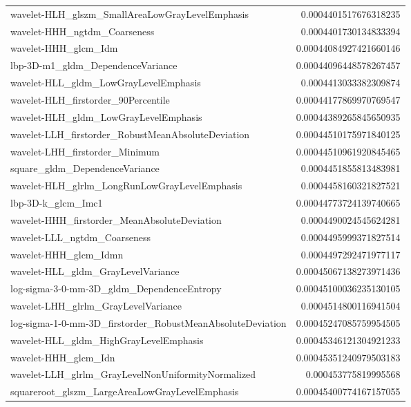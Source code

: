 {\begin{xltabular}[H]{\textwidth}{X r}
        wavelet-HLH\_glszm\_SmallAreaLowGrayLevelEmphasis & 0.0004401517676318235 \\
        wavelet-HHH\_ngtdm\_Coarseness & 0.0004401730134833394 \\
        wavelet-HHH\_glcm\_Idm & 0.00044084927421660146 \\
        lbp-3D-m1\_gldm\_DependenceVariance & 0.00044096448578267457 \\
        wavelet-HLL\_gldm\_LowGrayLevelEmphasis & 0.0004413033382309874 \\
        wavelet-HLH\_firstorder\_90Percentile & 0.00044177869970769547 \\
        wavelet-HLH\_gldm\_LowGrayLevelEmphasis & 0.00044389265845650935 \\
        wavelet-LLH\_firstorder\_RobustMeanAbsoluteDeviation & 0.00044510175971840125 \\
        wavelet-LHH\_firstorder\_Minimum & 0.00044510961920845465 \\
        square\_gldm\_DependenceVariance & 0.0004451855813483981 \\
        wavelet-HLH\_glrlm\_LongRunLowGrayLevelEmphasis & 0.0004458160321827521 \\
        lbp-3D-k\_glcm\_Imc1 & 0.00044773724139740665 \\
        wavelet-HHH\_firstorder\_MeanAbsoluteDeviation & 0.0004490024545624281 \\
        wavelet-LLL\_ngtdm\_Coarseness & 0.0004495999371827514 \\
        wavelet-HHH\_glcm\_Idmn & 0.0004497292471977117 \\
        wavelet-HLL\_gldm\_GrayLevelVariance & 0.00045067138273971436 \\
        log-sigma-3-0-mm-3D\_gldm\_DependenceEntropy & 0.00045100036235130105 \\
        wavelet-LHH\_glrlm\_GrayLevelVariance & 0.0004514800116941504 \\
        log-sigma-1-0-mm-3D\_firstorder\_RobustMeanAbsoluteDeviation & 0.00045247085759954505 \\
        wavelet-HLL\_gldm\_HighGrayLevelEmphasis & 0.00045346121304921233 \\
        wavelet-HHH\_glcm\_Idn & 0.00045351240979503183 \\
        wavelet-LLH\_glrlm\_GrayLevelNonUniformityNormalized & 0.000453775819995568 \\
        squareroot\_glszm\_LargeAreaLowGrayLevelEmphasis & 0.00045400774167157055 \\

\end{xltabular}}
